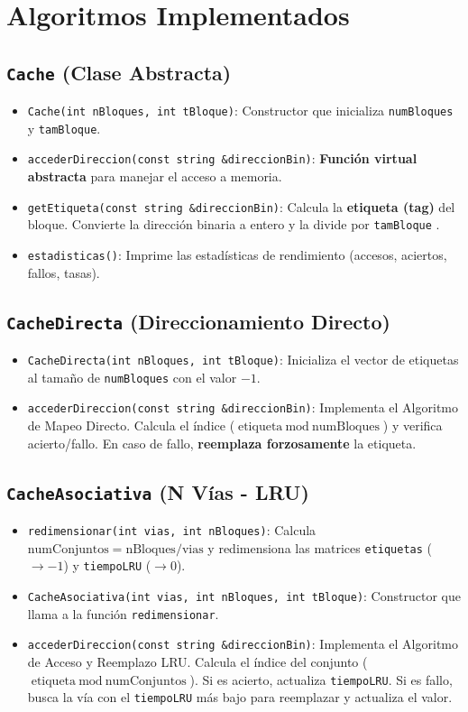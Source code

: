 \documentclass{article}
\begin{document}
\section{Algoritmos Implementados}

\subsection{\texttt{Cache} (Clase Abstracta)}
\begin{itemize}
    \item \texttt{Cache(int nBloques, int tBloque)}: Constructor que inicializa \texttt{numBloques} y \texttt{tamBloque}.
    \item \texttt{accederDireccion(const string \&direccionBin)}: \textbf{Función virtual abstracta} para manejar el acceso a memoria.
    \item \texttt{getEtiqueta(const string \&direccionBin)}: Calcula la \textbf{etiqueta (tag)} del bloque. Convierte la dirección binaria a entero y la divide por \texttt{tamBloque} .
    \item \texttt{estadisticas()}: Imprime las estadísticas de rendimiento (accesos, aciertos, fallos, tasas).
\end{itemize}

\subsection{\texttt{CacheDirecta} (Direccionamiento Directo)}
\begin{itemize}
    \item \texttt{CacheDirecta(int nBloques, int tBloque)}: Inicializa el vector de etiquetas al tamaño de \texttt{numBloques} con el valor \textbf{$-1$}.
    \item \texttt{accederDireccion(const string \&direccionBin)}: Implementa el Algoritmo de Mapeo Directo. Calcula el índice ($\text{etiqueta} \bmod \text{numBloques}$) y verifica acierto/fallo. En caso de fallo, \textbf{reemplaza forzosamente} la etiqueta.
\end{itemize}

\subsection{\texttt{CacheAsociativa} (N Vías - LRU)}
\begin{itemize}
    \item \texttt{redimensionar(int vias, int nBloques)}: Calcula $\text{numConjuntos} = \text{nBloques}/\text{vias}$ y redimensiona las matrices \texttt{etiquetas} ($\rightarrow -1$) y \texttt{tiempoLRU} ($\rightarrow 0$).
    \item \texttt{CacheAsociativa(int vias, int nBloques, int tBloque)}: Constructor que llama a la función \texttt{redimensionar}.
    \item \texttt{accederDireccion(const string \&direccionBin)}: Implementa el Algoritmo de Acceso y Reemplazo LRU. Calcula el índice del conjunto ($\text{etiqueta} \bmod \text{numConjuntos}$). Si es acierto, actualiza \texttt{tiempoLRU}. Si es fallo, busca la vía con el \texttt{tiempoLRU} más bajo para reemplazar y actualiza el valor.
\end{itemize}
\end{document}

